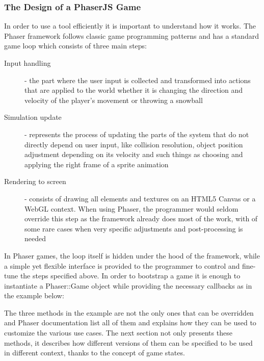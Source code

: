 \subsubsection{The Design of a PhaserJS Game}

In order to use a tool efficiently it is important to understand how it works.
The Phaser framework follows classic game programming patterns and has a
standard game loop which consists of three main steps:

\begin{description}

\item [Input handling] - the part where the user input is collected and
transformed into actions that are applied to the world whether it is changing
the direction and velocity of the player's movement or throwing a snowball

\item [Simulation update] - represents the process of updating the parts of the
system that do not directly depend on user input, like collision resolution,
object position adjustment depending on its velocity and such things as choosing
and applying the right frame of a sprite animation

\item [Rendering to screen] - consists of drawing all elements and textures on
an HTML5 Canvas or a WebGL context. When using Phaser, the programmer would
seldom override this step as the framework already does most of the work, with
of some rare cases when very specific adjustments and post-processing is needed

\end{description}

In Phaser games, the loop itself is hidden under the hood of the framework,
while a simple yet flexible interface is provided to the programmer to control
and fine-tune the steps specified above. In order to bootstrap a game it is
enough to instantiate a Phaser::Game object while providing the necessary
callbacks as in the example below:



The three methods in the example are not the only ones that can be overridden
and Phaser documentation list all of them and explains how they can be used to
customize the various use cases. The next section not only presents these
methods, it describes how different versions of them can be specified to be used
in different context, thanks to the concept of game states.


